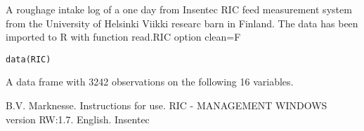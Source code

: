\documentclass{book}
\begin{document}
\begin{Description}\relax
A roughage intake log of a one day from Insentec RIC feed measurement
system from the University of Helsinki Viikki researc barn in Finland.
The data has been imported to R with function read.RIC option clean=F
\end{Description}
\begin{Usage}
\begin{verbatim}data(RIC)\end{verbatim}
\end{Usage}
\begin{Format}\relax
A data frame with 3242 observations on the following 16 variables.
\end{Format}
\begin{References}\relax
B.V. Marknesse. Instructions for use. RIC - MANAGEMENT WINDOWS version
RW:1.7. English. Insentec
\end{References}
\end{document}
